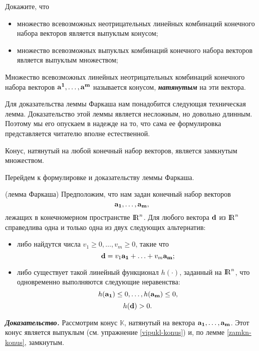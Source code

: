 \begin{exer}\label{vipukl-konus}
    Докажите, что
\begin{itemize}
      \item
      множество всевозможных неотрицательных линейных комбинаций конечного набора
      векторов является выпуклым конусом;
      \item
      множество всевозможных выпуклых комбинаций конечного набора
      векторов является выпуклым множеством;
 \end{itemize}
\end{exer}

    Множество всевозможных линейных неотрицательных комбинаций
    конечного набора векторов $\mathbf{a^{1}},\ldots,\mathbf{a^{m}}$
    называется конусом, \emph{\textbf{натянутым}} на эти вектора.


    Для доказательства леммы Фаркаша нам понадобится следующая
    техническая лемма. Доказательство этой леммы является несложным, но
    довольно длинным. Поэтому мы его опускаем в надежде на то, что
    сама ее формулировка представляется читателю вполне
    естественной.

\begin{lem}\label{zamkn-konus}
    Конус, натянутый на любой конечный набор векторов, является
    замкнутым множеством.
\end{lem}


    Перейдем к формулировке и доказательству леммы Фаркаша.


\begin{teop}(лемма Фаркаша) \label{lemma-F1}
    Предположим, что нам задан конечный набор векторов
    \[\mathbf{a_{1}},\ldots,\mathbf{a_{m}},\]
    лежащих в конечномерном пространстве ${{\rm I\!R}}^{n}$. Для любого
    вектора $\mathbf{d}$ из ${{\rm I\!R}}^{n}$ справедлива одна и только одна из двух
    следующих альтернатив:
\begin{itemize}
    \item [1)\ ] либо найдутся числа
    $v_{1}\geq0,\ldots,v_{m}\geq0$, такие что
    \[\mathbf{d}=v_{1}\mathbf{a_{1}}+\ldots+v_{m}\mathbf{a_{m}};\]

    \item [2)\ ] либо существует такой линейный функционал $h(\cdot)$,
    заданный на ${{\rm I\!R}}^{n}$, что одновременно выполняются следующие неравенства:
    \[h(\mathbf{a_{1}})\leq0,\ldots,h(\mathbf{a_{m}})\leq0,\]
    \[h(\mathbf{d})>0.\]
\end{itemize}
\end{teop}

    \emph{\textbf{Доказательство.}}
    Рассмотрим конус $\mathbb{K}$, натянутый на вектора
    $\mathbf{a_{1}},\ldots,\mathbf{a_{m}}$. Этот конус является выпуклым
    (см. упражнение \ref{vipukl-konus}) и, по
    лемме \ref{zamkn-konus}, замкнутым.

